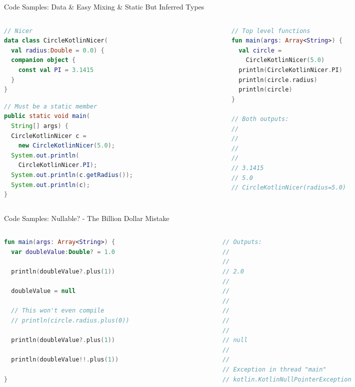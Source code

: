 \begin{frame}[fragile]{Code Samples: Data \& Easy Mixing \& Static But Inferred Types}
	\begin{columns}
		\begin{column}{0.5\textwidth}
\begin{lstlisting}[language=Kotlin,basicstyle=\ttfamily\scriptsize]
// Nicer
data class CircleKotlinNicer(
  val radius:Double = 0.0) {
  companion object {
    const val PI = 3.1415
  }
}
\end{lstlisting}
\begin{lstlisting}[language=java,basicstyle=\ttfamily\scriptsize]
// Must be a static member
public static void main(
  String[] args) {
  CircleKotlinNicer c =
    new CircleKotlinNicer(5.0);
  System.out.println(
    CircleKotlinNicer.PI);
  System.out.println(c.getRadius());
  System.out.println(c);
}
\end{lstlisting}
		\end{column}
		\begin{column}{0.5\textwidth}
\begin{lstlisting}[language=Kotlin,basicstyle=\ttfamily\scriptsize]
// Top level functions
fun main(args: Array<String>) {
  val circle =
    CircleKotlinNicer(5.0)
  println(CircleKotlinNicer.PI)
  println(circle.radius)
  println(circle)
}

// Both outputs:
// 
// 
// 
//
// 3.1415
// 5.0
// CircleKotlinNicer(radius=5.0)
\end{lstlisting}
		\end{column}
	\end{columns}
\end{frame}

\begin{frame}[fragile]{Code Samples: Nullable? - The Billion Dollar Mistake}
	\begin{columns}
		\begin{column}{0.5\textwidth}
\begin{lstlisting}[language=Kotlin,basicstyle=\ttfamily\scriptsize]
fun main(args: Array<String>) {
  var doubleValue:Double? = 1.0

  println(doubleValue?.plus(1))

  doubleValue = null

  // This won't even compile
  // println(circle.radius.plus(0))

  println(doubleValue?.plus(1))

  println(doubleValue!!.plus(1))

}
\end{lstlisting}
		\end{column}
		\begin{column}{0.5\textwidth}
\begin{lstlisting}[language=Kotlin,basicstyle=\ttfamily\scriptsize]
// Outputs:
//
//
// 2.0
// 
// 
// 
// 
// 
//
// null
// 
//
// Exception in thread "main"
// kotlin.KotlinNullPointerException
\end{lstlisting}
		\end{column}
	\end{columns}
\end{frame}


